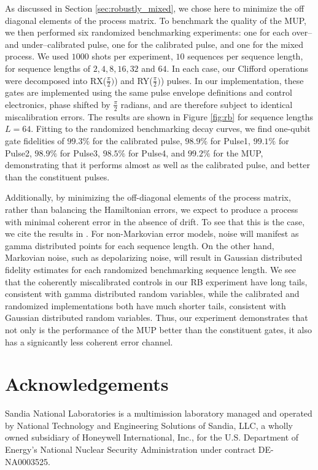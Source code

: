 \documentclass[aps,nofootinbib,pra,notitlepage,twocolumn]{revtex4-1}
\begin{document}
As discussed in Section \ref{sec:robustly_mixed}, we chose here to minimize the off diagonal elements of the process matrix. To benchmark the quality of the MUP, we then performed six randomized benchmarking experiments\cite{Magesan2011}: one for each over-- and under--calibrated pulse, one for the calibrated pulse, and one for the mixed process. We used $1000$ shots per experiment, $10$ sequences per sequence length, for sequence lengths of $2, 4, 8, 16, 32$ and $64$. In each case, our Clifford operations were decomposed into RX($\frac{\pi}{2})$) and RY($\frac{\pi}{2})$) pulses. In our implementation, these gates are implemented using the same pulse envelope definitions and control electronics, phase shifted by $\frac{\pi}{2}$ radians, and are therefore subject to identical miscalibration errors. The results are shown in Figure \ref{fig:rb} for sequence lengths $L=64$. Fitting to the randomized benchmarking decay curves, we find one-qubit gate fidelities of $99.3\%$ for the calibrated pulse, $98.9\%$ for Pulse1, $99.1\%$ for Pulse2, $98.9\%$ for Pulse3, $98.5\%$ for Pulse4, and $99.2\%$ for the MUP, demonstrating that it performs almost as well as the calibrated pulse, and better than the constituent pulses. 

Additionally, by minimizing the off-diagonal elements of the process matrix, rather than balancing the Hamiltonian errors, we expect to produce a process with minimal coherent error in the absence of drift. To see that this is the case, we cite the results in \cite{Ball2016}. For non-Markovian error models, noise will manifest as gamma distributed points for each sequence length. On the other hand, Markovian noise, such as depolarizing noise, will result in Gaussian distributed fidelity estimates for each randomized benchmarking sequence length. We see that the coherently miscalibrated controls in our RB experiment have long tails, consistent with gamma distributed random variables, while the calibrated and randomized implementations both have much shorter tails, consistent with Gaussian distributed random variables. Thus, our experiment demonstrates that not only is the performance of the MUP better than the constituent gates, it also has a signicantly less coherent error channel.


\section{Acknowledgements}
\label{sec:acknowledgements}
Sandia National Laboratories is a multimission laboratory managed and operated by National Technology and Engineering Solutions of Sandia, LLC, a wholly owned subsidiary of Honeywell International, Inc., for the U.S. Department of Energy's National Nuclear Security Administration under contract DE-NA0003525.

\end{document}
